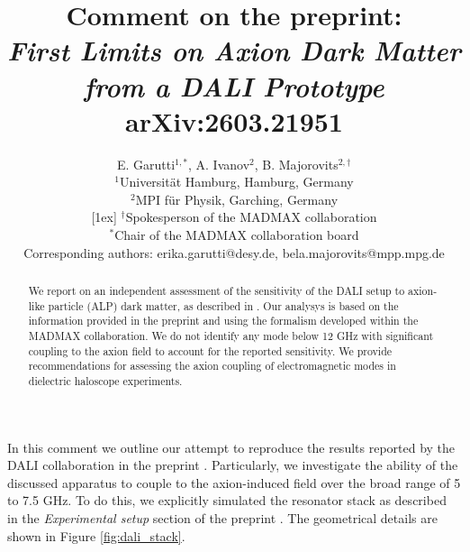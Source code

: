 \documentclass{article}
\title{Comment on the preprint:\\ 
\textit{First Limits on Axion Dark Matter from a DALI Prototype} \\ arXiv:2603.21951
}
\author{
E. Garutti$^{1,*}$,
A. Ivanov$^{2}$,
B. Majorovits$^{2,\dagger}$ \\[1ex]
{\small $^{1}$Universität Hamburg, Hamburg, Germany} \\
{\small $^{2}$MPI für Physik, Garching, Germany} \\
[1ex]
{\small $^{\dagger}$Spokesperson of the MADMAX collaboration} \\
{\small $^{*}$Chair of the MADMAX collaboration board} \\
{\small Corresponding authors: erika.garutti@desy.de, bela.majorovits@mpp.mpg.de}
}
\begin{document}
\maketitle

\begin{abstract}


We report on an independent assessment of the sensitivity of the DALI setup to axion-like particle (ALP) dark matter, as described in \cite{demiguel2026limitsaxiondarkmatter}. Our analysys is based on the information provided in the preprint and using the formalism developed within the MADMAX collaboration. We do not identify any mode below 12 GHz with significant coupling to the axion field to account for the reported sensitivity. We provide recommendations for assessing the axion coupling of electromagnetic modes in dielectric haloscope experiments.

\end{abstract}


\clearpage



In this comment we outline our attempt to reproduce the results reported by the DALI collaboration in the preprint  \cite{demiguel2026limitsaxiondarkmatter}. Particularly, we investigate the ability of the discussed apparatus to couple to the axion-induced field over the broad range of 5 to 7.5 GHz. To do this, we explicitly simulated the resonator stack as described in the \textit {Experimental setup} section of the preprint   \cite{demiguel2026limitsaxiondarkmatter}.
The geometrical details are shown in Figure \ref{fig:dali_stack}.
\end{document}
